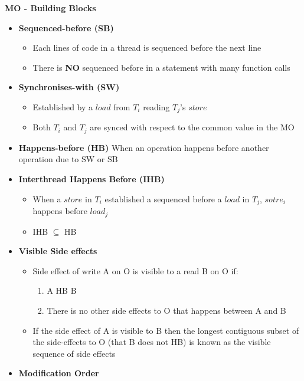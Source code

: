 \documentclass[10pt, landscape]{article}
\begin{document}
\begin{multicols}{4}
\textbf{MO - Building Blocks} \\
\begin{itemize}
    \item \textbf{Sequenced-before (SB)}
    \begin{itemize}
        \item Each lines of code in a thread is sequenced before the next line
        \item There is \textbf{NO} sequenced before in a statement with many function calls 
    \end{itemize}
    \item \textbf{Synchronises-with (SW)}
    \begin{itemize}
        \item Established by a $load$ from $T_i$ reading $T_j$'s $store$ 
        \item Both $T_i$ and $T_j$ are synced with respect to the common value in the MO
    \end{itemize}
    \item \textbf{Happens-before (HB)} When an operation happens before another operation due to SW or SB
    \item \textbf{Interthread Happens Before (IHB)}
    \begin{itemize}
        \item When a $store$ in $T_i$ established a sequenced before a $load$ in $T_j$, $sotre_i$ happens before $load_j$ 
        \item IHB $\subseteq$ HB
    \end{itemize}
    \item \textbf{Visible Side effects} 
    \begin{itemize}
        \item Side effect of write A on O is visible to a read B on O if:
        \begin{enumerate}
            \item A HB B
            \item There is no other side effects to O that happens between A and B
        \end{enumerate}
        \item If the side effect of A is visible to B then the longest contiguous subset of the side-effects to O (that B does not HB) is known as the visible sequence of side effects 
    \end{itemize}
    \item \textbf{Modification Order}
\end{itemize}


\end{multicols}
\end{document}
